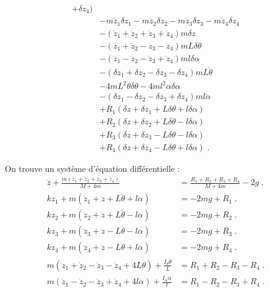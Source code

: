 \documentclass[a4paper,11pt]{amsart}
\begin{document}
\begin{align*}
                                               +\delta z_4)
                                               \\
                   &   - m\ddot{z}_1\delta z_1
                       - m\ddot{z}_2\delta z_2
                       - m\ddot{z}_3\delta z_3
                       - m\ddot{z}_4\delta z_4\\
                   &   - (\ddot{z}_1 + \ddot{z}_2 + \ddot{z}_3 + \ddot{z}_4
                         ) m\delta z\\
                   &   - (\ddot{z}_1+\ddot{z}_2-\ddot{z}_3-\ddot{z}_4)
                         mL\delta\theta \\
                   &   - (\ddot{z}_1-\ddot{z}_2-\ddot{z}_3+\ddot{z}_4)
                         ml\delta\alpha \\
                   &   - (\delta z_1+\delta z_2
                         -\delta z_3-\delta z_4) mL\ddot{\theta}\\
                   &   -4mL^2\ddot{\theta}\delta \theta 
                       -4ml^2\ddot{\alpha}\delta \alpha\\
                   &   -(\delta z_1-\delta z_2
                       -\delta z_3+\delta z_4) ml\ddot{\alpha}\\
                   &   +R_1(\delta z + \delta z_1 + L\delta\theta +
                                               l\delta\alpha)\\
                   &   +R_2(\delta z + \delta z_2 + L\delta\theta -
                                               l\delta\alpha)\\
                   &   +R_3(\delta z + \delta z_3 - L\delta\theta -
                                               l\delta\alpha)\\
                   &   +R_4(\delta z + \delta z_4 - L\delta\theta + l\delta\alpha)\;.
\end{align*}

On trouve un syst\`eme d'\'equation diff\'erentielle :
\begin{align}
\label{eqv01} \ddot{z}+\frac{m(\ddot{z}_1+\ddot{z}_2+\ddot{z}_3+\ddot{z}_4)}{M+4m} & = \frac{R_1+R_2+R_3+R_4}{M+4m}-2g\;. \\ 
\label{eqv02} kz_1+m(\ddot{z}_1+\ddot{z}+L\ddot{\theta}+l\ddot{\alpha}) & = -2mg +
R_1 \;. \\ 
\label{eqv03} kz_2+m(\ddot{z}_2+\ddot{z}+L\ddot{\theta}-l\ddot{\alpha}) & = -2mg +
R_2 \;. \\ 
\label{eqv04} kz_3+m(\ddot{z}_3+\ddot{z}-L\ddot{\theta}-l\ddot{\alpha}) & = -2mg +
R_3 \;. \\ 
\label{eqv05} kz_4+m(\ddot{z}_4+\ddot{z}-L\ddot{\theta}+l\ddot{\alpha}) & = -2mg +
R_4 \;. \\ 
\label{eqv06} m(\ddot{z}_1+\ddot{z}_2-\ddot{z}_3-\ddot{z}_4+4L\ddot{\theta})+\frac{I_{\theta}\ddot{\theta}}{L} 
& = R_1+R_2-R_3-R_4\;.\\ 
\label{eqv07}m(\ddot{z}_1-\ddot{z}_2-\ddot{z}_3+\ddot{z}_4+4l\ddot{\alpha})+\frac{I_{\alpha} \ddot{\alpha}}{l}
& = R_1-R_2-R_3+R_4 \;.
\end{align}
\end{document}
